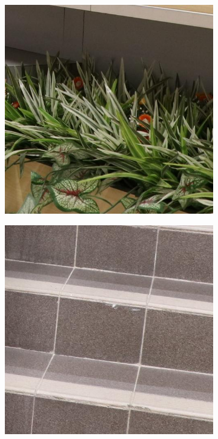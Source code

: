 \begin{figure}
    \centering
    \begin{subfigure}[t]{0.19\textwidth}
        \centering
        \includegraphics[width=1\textwidth]{images/guided/Canon_80D_ISO800_IMG_9916_part6.JPG}
    \end{subfigure}
    \hfill
    \begin{subfigure}[t]{0.19\textwidth}
        \centering
        \includegraphics[width=1\textwidth]{images/guided/Canon_80D_ISO1600_IMG_1056_part2.JPG}

\end{subfigure}
\end{figure}
